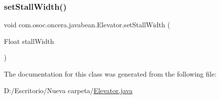 \subsubsection{\texorpdfstring{setStallWidth()}{setStallWidth()}}
{\footnotesize\ttfamily void com.\+osoc.\+oncera.\+javabean.\+Elevator.\+set\+Stall\+Width (\begin{DoxyParamCaption}\item[{Float}]{stall\+Width }\end{DoxyParamCaption})}



The documentation for this class was generated from the following file\+:\begin{DoxyCompactItemize}
\item 
D\+:/\+Escritorio/\+Nueva carpeta/\mbox{\hyperlink{_elevator_8java}{Elevator.\+java}}\end{DoxyCompactItemize}
